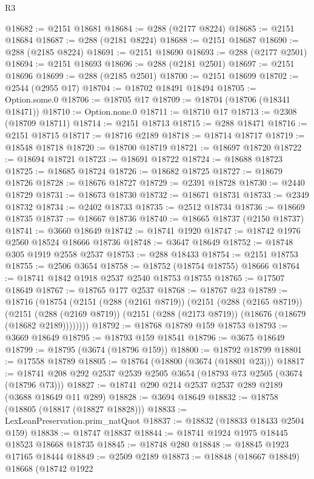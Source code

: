 \begin{lexlean}{R3}
\begin{coremodule}
@18682 := @2151 @18681
@18684 := @288 (@2177 @8224)
@18685 := @2151 @18684
@18687 := @288 (@2181 @8224)
@18688 := @2151 @18687
@18690 := @288 (@2185 @8224)
@18691 := @2151 @18690
@18693 := @288 (@2177 @2501)
@18694 := @2151 @18693
@18696 := @288 (@2181 @2501)
@18697 := @2151 @18696
@18699 := @288 (@2185 @2501)
@18700 := @2151 @18699
@18702 := @2544 (@2955 @17)
@18704 := @18702 @18491 @18494
@18705 := Option.some.{0}
@18706 := @18705 @17
@18709 := @18704 (@18706 (@18341 @18471))
@18710 := Option.none.{0}
@18711 := @18710 @17
@18713 := @2308 (@18709 @18711)
@18714 := @2151 @18713
@18715 := @288 @18471
@18716 := @2151 @18715
@18717 := @18716 @2189
@18718 := @18714 @18717
@18719 := @18548 @18718
@18720 := @18700 @18719
@18721 := @18697 @18720
@18722 := @18694 @18721
@18723 := @18691 @18722
@18724 := @18688 @18723
@18725 := @18685 @18724
@18726 := @18682 @18725
@18727 := @18679 @18726
@18728 := @18676 @18727
@18729 := @2391 @18728
@18730 := @2440 @18729
@18731 := @18673 @18730
@18732 := @18671 @18731
@18733 := @2349 @18732
@18734 := @2402 @18733
@18735 := @2512 @18734
@18736 := @18669 @18735
@18737 := @18667 @18736
@18740 := @18665 @18737 (@2150 @18737)
@18741 := @3660 @18649
@18742 := @18741 @1920
@18747 := @18742 @1976 @2560 @18524 @18666 @18736
@18748 := @3647 @18649
@18752 := @18748 @305 @1919 @2558 @2537
@18753 := @288 @18433
@18754 := @2151 @18753
@18755 := @2506 @3654
@18758 := @18752 (@18754 @18755) @18666
@18764 := @18741 @1842 @1918 @2537 @2540 @18753 @18755
@18765 := @17507 @18649
@18767 := @18765 @177 @2537
@18768 := @18767 @23
@18789 := @18716
    (@18754
      (@2151
        (@288 (@2161 @8719))
        (@2151
          (@288 (@2165 @8719))
          (@2151
            (@288 (@2169 @8719))
            (@2151 (@288 (@2173 @8719)) (@18676 (@18679 (@18682 @2189))))))))
@18792 := @18768 @18789 @159 @18753
@18793 := @3669 @18649
@18795 := @18793 @159 @18541
@18796 := @3675 @18649
@18799 := @18795 (@3674 (@18796 @159))
@18800 := @18792 @18799
@18801 := @17558 @18789
@18805 := @18764 (@18800 (@3674 (@18801 @23)))
@18817 := @18741 @208 @292 @2537 @2539 @2505 @3654 (@18793 @73 @2505 (@3674 (@18796 @73)))
@18827 := @18741 @290 @214 @2537 @2537 @289 @2189 (@3688 @18649 @11 @289)
@18828 := @3694 @18649
@18832 := @18758 (@18805 (@18817 (@18827 @18828)))
@18833 := LexLeanPreservation.prim_natQuot
@18837 := @18832 (@18833 @18433 @2504 @159)
@18838 := @18747 @18837
@18844 := @18741 @1924 @1975 @18445 @18523 @18668 @18735
@18845 := @18748 @280
@18848 := @18845 @1923 @17165 @18444
@18849 := @2509 @2189
@18873 := @18848
    (@18667 @18849)
    @18668
    (@18742
      @1922

\end{coremodule}
\end{lexlean}
